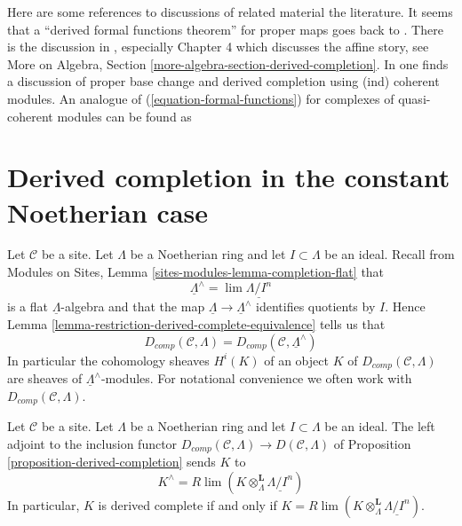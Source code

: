 \begin{remark}
\label{remark-references}
Here are some references to discussions of related material the literature.
It seems that a ``derived formal functions theorem'' for proper maps
goes back to \cite[Theorem 6.3.1]{lurie-thesis}.
There is the discussion in \cite{dag12}, especially
Chapter 4 which discusses the affine story, see
More on Algebra, Section \ref{more-algebra-section-derived-completion}.
In \cite[Section 2.9]{G-R} one finds a discussion of proper base change and
derived completion using (ind) coherent modules.
An analogue of (\ref{equation-formal-functions})
for complexes of quasi-coherent modules can be found as
\cite[Theorem 6.5]{HL-P}
\end{remark}



\section{Derived completion in the constant Noetherian case}
\label{section-derived-completion-noetherian}

\noindent
Let $\mathcal{C}$ be a site. Let $\Lambda$ be a Noetherian ring
and let $I \subset \Lambda$ be an ideal. Recall from
Modules on Sites, Lemma \ref{sites-modules-lemma-completion-flat}
that
$$
\underline{\Lambda}^\wedge = \lim \underline{\Lambda/I^n}
$$
is a flat $\underline{\Lambda}$-algebra and that the map
$\underline{\Lambda} \to \underline{\Lambda}^\wedge$ identifies
quotients by $I$. Hence
Lemma \ref{lemma-restriction-derived-complete-equivalence}
tells us that
$$
D_{comp}(\mathcal{C}, \Lambda) =
D_{comp}(\mathcal{C}, \underline{\Lambda}^\wedge)
$$
In particular the cohomology sheaves $H^i(K)$ of an object $K$ of
$D_{comp}(\mathcal{C}, \Lambda)$ are sheaves of
$\underline{\Lambda}^\wedge$-modules.
For notational convenience we often work with
$D_{comp}(\mathcal{C}, \Lambda)$.

\begin{lemma}
\label{lemma-naive-completion}
Let $\mathcal{C}$ be a site. Let $\Lambda$ be a Noetherian ring
and let $I \subset \Lambda$ be an ideal. The left adjoint
to the inclusion functor
$D_{comp}(\mathcal{C}, \Lambda) \to D(\mathcal{C}, \Lambda)$
of Proposition \ref{proposition-derived-completion} sends $K$ to
$$
K^\wedge = R\lim(K \otimes_\Lambda^\mathbf{L} \underline{\Lambda/I^n})
$$
In particular, $K$ is derived complete if and only if
$K = R\lim(K \otimes_\Lambda^\mathbf{L} \underline{\Lambda/I^n})$.
\end{lemma}

